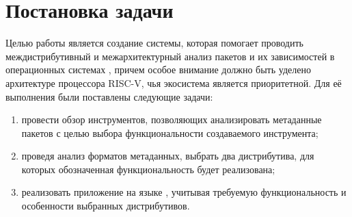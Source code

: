 
\section{Постановка задачи}
\label{sec:task}
Целью работы является создание системы, которая помогает проводить междистрибутивный и межархитектурный анализ пакетов и их зависимостей в операционных системах {\linux}, причем особое внимание должно быть уделено архитектуре процессора \textsc{RISC-V}, чья экосистема является приоритетной.
Для её выполнения были поставлены следующие задачи:
\begin{enumerate}
	\item провести обзор инструментов, позволяющих анализировать метаданные пакетов с целью выбора функциональности создаваемого инструмента;
	\item проведя анализ форматов метаданных, вы\-брать два дистрибутива, для которых обозначенная функциональность будет реализована;
	\item реализовать приложение на языке {\python}, учитывая требуемую функциональность и особенности выбранных дистрибутивов.
\end{enumerate}
